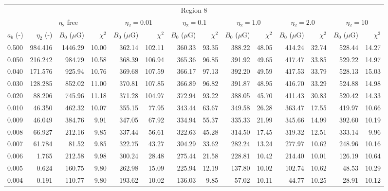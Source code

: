 \begin{tabular}{@{}lrrrrrrrrrrrrr@{}}
\toprule
\multicolumn{14}{c}{Region 8} \\
\cmidrule{1-14}
{} & \multicolumn{3}{c}{$\eta_2$ free} & \multicolumn{2}{c}{$\eta_2 = 0.01$}
   & \multicolumn{2}{c}{$\eta_2 = 0.1$} & \multicolumn{2}{c}{$\eta_2 = 1.0$}
   & \multicolumn{2}{c}{$\eta_2 = 2.0$} & \multicolumn{2}{c}{$\eta_2 = 10$} \\
\cmidrule(lr){2-4} \cmidrule(lr){5-6} \cmidrule(lr){7-8} \cmidrule(lr){9-10}
    \cmidrule(lr){11-12} \cmidrule(lr){13-14}
$a_b$ (-) & $\eta_2$ (-) & $B_0$ ($\mu$G) & $\chi^2$
& $B_0$ ($\mu$G) & $\chi^2$ & $B_0$ ($\mu$G) & $\chi^2$
& $B_0$ ($\mu$G) & $\chi^2$ & $B_0$ ($\mu$G) & $\chi^2$
& $B_0$ ($\mu$G) & $\chi^2$ \\
\cmidrule{1-14}
0.500 & 984.416 & 1446.29 & 10.00 & 362.14 & 102.11 & 360.33 & 93.35 & 388.22 & 48.05 & 414.24 & 32.74 & 528.44 & 14.27 \\
0.050 & 216.242 & 984.79 & 10.58 & 368.39 & 106.94 & 365.36 & 96.85 & 391.92 & 49.65 & 417.47 & 33.85 & 529.22 & 14.97 \\
0.040 & 171.576 & 925.94 & 10.76 & 369.68 & 107.59 & 366.17 & 97.13 & 392.20 & 49.59 & 417.53 & 33.79 & 528.13 & 15.03 \\
0.030 & 128.285 & 852.02 & 11.00 & 370.81 & 107.85 & 366.89 & 96.82 & 391.87 & 48.95 & 416.70 & 33.29 & 524.88 & 14.98 \\
0.020 & 88.206 & 745.96 & 11.18 & 371.28 & 104.97 & 372.94 & 93.22 & 388.05 & 45.70 & 411.43 & 30.83 & 520.42 & 14.33 \\
0.010 & 46.350 & 462.32 & 10.07 & 355.15 & 77.95 & 343.44 & 63.67 & 349.58 & 26.28 & 363.47 & 17.55 & 419.97 & 10.66 \\
0.009 & 46.049 & 384.76 & 9.91 & 347.05 & 67.92 & 334.94 & 55.37 & 335.33 & 21.99 & 345.66 & 14.99 & 392.60 & 10.19 \\
0.008 & 66.927 & 212.16 & 9.85 & 337.44 & 56.61 & 322.63 & 45.28 & 314.50 & 17.45 & 319.32 & 12.51 & 333.14 & 9.96 \\
0.007 & 61.784 & 81.52 & 9.85 & 322.75 & 43.27 & 304.29 & 33.62 & 282.24 & 13.24 & 277.97 & 10.62 & 248.96 & 10.16 \\
0.006 & 1.765 & 212.58 & 9.98 & 300.24 & 28.48 & 275.44 & 21.58 & 228.81 & 10.42 & 214.40 & 10.01 & 126.19 & 10.64 \\
0.005 & 0.624 & 160.75 & 9.80 & 262.98 & 15.09 & 225.94 & 12.19 & 137.80 & 10.02 & 102.74 & 10.62 & 48.53 & 10.29 \\
0.004 & 0.191 & 110.77 & 9.80 & 193.62 & 10.02 & 136.03 & 9.85 & 57.02 & 10.11 & 44.77 & 10.25 & 28.91 & 10.12 \\


\end{tabular}
